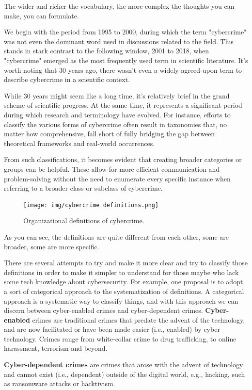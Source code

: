 The wider and richer the vocabulary, the more complex the thoughts you
can make, you can formulate.

We begin with the period from 1995 to 2000, during which the term
"cybercrime" was not even the dominant word used in discussions
related to the field. This stands in stark contrast to the following
window, 2001 to 2018, when "cybercrime" emerged as the most frequently
used term in scientific literature. It’s worth noting that 30 years
ago, there wasn’t even a widely agreed-upon term to describe
cybercrime in a scientific context. 

While 30 years might seem like a long time, it’s relatively brief in
the grand scheme of scientific progress. At the same time, it
represents a significant period during which research and terminology
have evolved. For instance, efforts to classify the various forms of
cybercrime often result in taxonomies that, no matter how
comprehensive, fall short of fully bridging the gap between
theoretical frameworks and real-world occurrences.

From such classifications, it becomes evident that creating broader
categories or groups can be helpful. These allow for more efficient
communication and problem-solving without the need to enumerate every
specific instance when referring to a broader class or subclass of
cybercrime.

\begin{figure}[H]
  \centering
  \texttt{[image: img/cybercrime
  definitions.png]}
  \caption{Organizational definitions of cybercrime.}
\end{figure}

As you can see, the definitions are quite different from each other,
some are broader, some are more specific.

There are several attempts to try and make it more clear and try to
classify those definitions in order to make it simpler to understand
for those maybe who lack some tech knowledge about cybersecurity. For
example, one proposal is to adopt a sort of categorical approach to
the systematization of definitions. A categorical approach is a 
systematic way to classify things, and with this approach we can
discern between cyber-enabled crimes and cyber-dependent crimes. 
\textbf{Cyber-enabled} crimes are traditional crimes that predate the
advent of the technology, and are now facilitated or have been made
easier (i.e., enabled) by cyber technology. Crimes range from
white-collar crime to drug trafficking, to online harassment,
terrorism and beyond.

\textbf{Cyber-dependent crimes} are crimes that arose with the advent
of technology and cannot exist (i.e., dependent) outside of the
digital world, e.g., hacking, such as ransomware attacks or
hacktivism.
